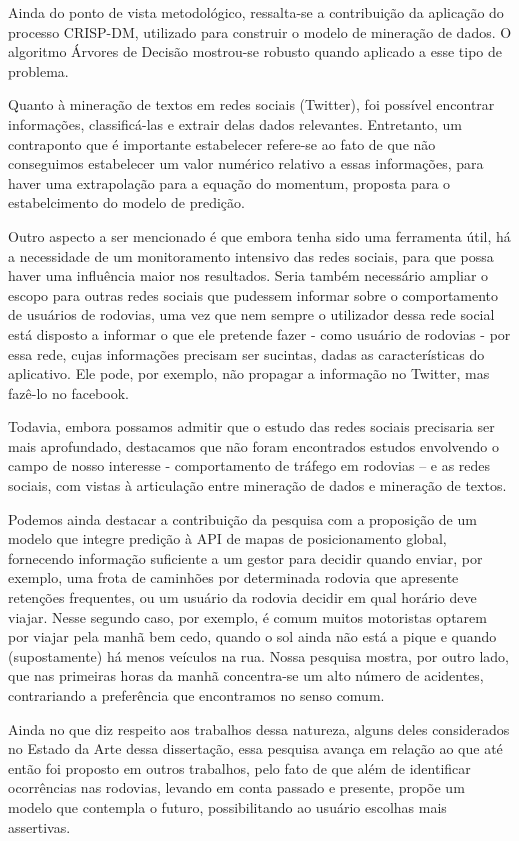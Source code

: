 Ainda do ponto de vista metodológico, ressalta-se a contribuição da aplicação do processo CRISP-DM,
utilizado para construir o modelo de mineração de dados. 
O algoritmo Árvores de Decisão mostrou-se robusto quando aplicado a esse tipo de problema.

Quanto à mineração de textos em redes sociais (Twitter), foi possível encontrar informações, classificá-las e extrair delas dados relevantes. Entretanto, um contraponto que é importante estabelecer refere-se ao fato de que não conseguimos estabelecer um valor numérico relativo a essas informações, para haver uma extrapolação para a equação do momentum, proposta para o estabelcimento do modelo de predição. 

Outro aspecto a ser mencionado é que embora tenha sido uma ferramenta útil, há a necessidade de um monitoramento intensivo das redes sociais, para que possa haver uma influência maior nos resultados. Seria também necessário ampliar o escopo para outras redes sociais que pudessem informar sobre o comportamento de usuários de rodovias, uma vez que nem sempre o utilizador dessa rede social está disposto a informar o que ele pretende fazer - como usuário de rodovias - por essa rede, cujas informações precisam ser sucintas, dadas as características do aplicativo. Ele pode, por exemplo, não propagar a informação no Twitter, mas fazê-lo no facebook.

Todavia, embora possamos admitir que o estudo das redes sociais precisaria ser mais aprofundado, destacamos que não foram encontrados estudos envolvendo o campo de nosso interesse - comportamento de tráfego em rodovias – e as redes sociais, com vistas à articulação entre mineração de dados e mineração de textos.  

Podemos ainda destacar a contribuição da pesquisa com a proposição de um modelo que integre predição à
API de mapas de posicionamento global, fornecendo informação suficiente a um gestor para decidir quando enviar,
por exemplo, uma frota de caminhões por determinada rodovia que apresente retenções frequentes, ou um usuário da rodovia decidir em qual horário deve viajar. Nesse segundo caso, por exemplo, é comum muitos motoristas optarem por viajar pela manhã bem cedo, quando o sol ainda não está a pique e quando (supostamente) há menos veículos na rua. Nossa pesquisa mostra, por outro lado, que nas primeiras horas da manhã concentra-se um alto número de acidentes, contrariando a preferência que encontramos no senso comum.  

Ainda no que diz respeito aos trabalhos dessa natureza, alguns deles considerados no Estado da Arte dessa dissertação, essa pesquisa avança em relação ao que até então foi proposto em outros trabalhos, pelo fato de que além de identificar ocorrências nas rodovias, levando em conta passado e presente, propõe um modelo que contempla o futuro, possibilitando ao usuário escolhas mais assertivas.

